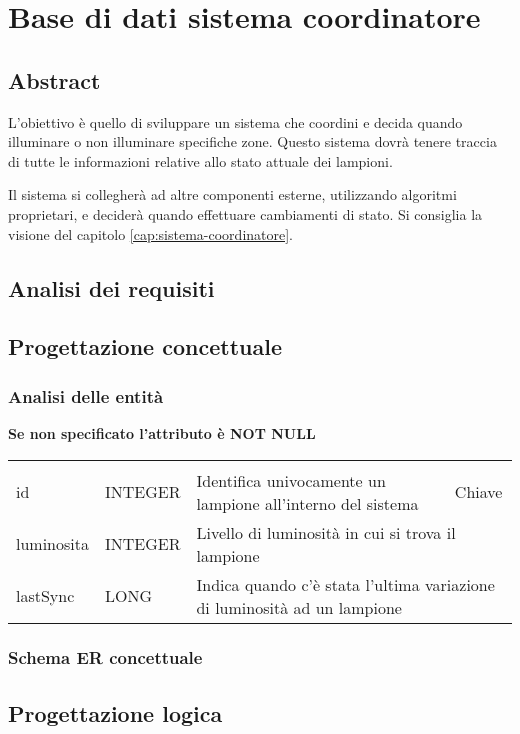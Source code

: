 \section{Base di dati sistema coordinatore}

\subsection{Abstract}

L'obiettivo è quello di sviluppare un sistema che coordini e decida quando illuminare o non illuminare specifiche zone. Questo sistema dovrà tenere traccia di tutte le informazioni relative allo stato attuale dei lampioni.

Il sistema si collegherà ad altre componenti esterne, utilizzando algoritmi proprietari, e deciderà quando effettuare cambiamenti di stato. Si consiglia la visione del capitolo \ref{cap:sistema-coordinatore}.


\subsection{Analisi dei requisiti}

\subsection{Progettazione concettuale}

\subsubsection{Analisi delle entità}

\textbf{Se non specificato l'attributo è NOT NULL}

\begin{center}
    \begin{tabularx}{\textwidth}{|l|l|l|X|}
        \hline
        \rowcolor{gray!30}
        \multicolumn{4}{|c|}{\textbf{LAMPIONE}}\\
        id & INTEGER & Identifica univocamente un lampione all'interno del sistema & Chiave\\
        \hline
        luminosita & INTEGER & \multicolumn{2}{l|}{Livello di luminosità in cui si trova il lampione} \\
        \hline
        lastSync & LONG & \multicolumn{2}{l|}{Indica quando c'è stata l'ultima variazione di luminosità ad un lampione} \\
        \hline
    \end{tabularx}
\end{center}

\subsubsection{Schema ER concettuale}

\subsection{Progettazione logica}